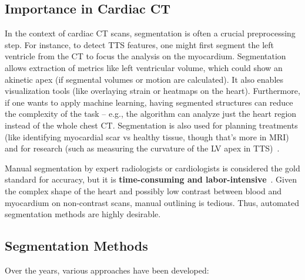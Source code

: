 \documentclass[12pt, BSc]{muthesis}
\begin{document}
\subsection{Importance in Cardiac CT}
In the context of cardiac CT scans, segmentation is often a crucial preprocessing step. For instance, to detect TTS features, one might first segment the left ventricle from the CT to focus the analysis on the myocardium. Segmentation allows extraction of metrics like left ventricular volume, which could show an akinetic apex (if segmental volumes or motion are calculated). It also enables visualization tools (like overlaying strain or heatmaps on the heart). Furthermore, if one wants to apply machine learning, having segmented structures can reduce the complexity of the task – e.g., the algorithm can analyze just the heart region instead of the whole chest CT. Segmentation is also used for planning treatments (like identifying myocardial scar vs healthy tissue, though that’s more in MRI) and for research (such as measuring the curvature of the LV apex in TTS)~\cite{Chen2020Deep, alnasser2024advancements}.

Manual segmentation by expert radiologists or cardiologists is considered the gold standard for accuracy, but it is \textbf{time-consuming and labor-intensive}~\cite{zhuang2013challenges, cardiacatlas2016manual}. Given the complex shape of the heart and possibly low contrast between blood and myocardium on non-contrast scans, manual outlining is tedious. Thus, automated segmentation methods are highly desirable.

\subsection{Segmentation Methods}
Over the years, various approaches have been developed:
\end{document}
